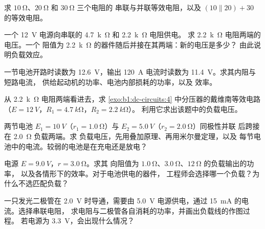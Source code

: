 \begin{exercise}[$\star$]\label{exo:b1:dc-circuits:3}
求 $\qty{10}{\ohm}$、$\qty{20}{\ohm}$ 和 $\qty{30}{\ohm}$ 三个电阻的
串联与并联等效电阻，以及
$(10 \parallel 20) + 30$ 的等效电阻。
\end{exercise}

\begin{exercise}[$\star$]\label{exo:b1:dc-circuits:4}
一个 \qty{12}{V} 电源向串联的 \qty{4.7}{k\ohm} 和 \qty{2.2}{k\ohm} 电阻供电。
求 \qty{2.2}{k\ohm} 电阻两端的电压。一个
阻值为 \qty{2.2}{k\ohm} 的器件随后并接在其两端：新的电压是多少？
由此说明负载效应。
\end{exercise}

\begin{exercise}[$\star\star$]\label{exo:b1:dc-circuits:5}
一节电池开路时读数为 \qty{12.6}{V}，输出
\qty{120}{A} 电流时读数为 \qty{11.4}{V}。求其内阻与短路电流，
供给起动机的功率、电池内部损耗的功率，以及
效率。
\end{exercise}

\begin{exercise}[$\star\star$]\label{exo:b1:dc-circuits:6}
从 \qty{2.2}{k\ohm} 电阻两端看进去，求
\cref{exo:b1:dc-circuits:4} 中分压器的戴维南等效电路
（$E = \qty{12}{V}$，$R_1 = \qty{4.7}{k\ohm}$，$R_2 = \qty{2.2}{k\ohm}$）。
利用它求出该题中的负载电压。
\end{exercise}

\begin{exercise}[$\star\star$]\label{exo:b1:dc-circuits:7}
两节电池 $E_1 = \qty{10}{V}$（$r_1 = \qty{1.0}{\ohm}$）与
$E_2 = \qty{5.0}{V}$（$r_2 = \qty{2.0}{\ohm}$）同极性并联
后跨接在 \qty{2.0}{\ohm} 负载两端。求
负载电压，先用叠加原理、再用米尔曼定理，以及
每节电池中的电流。较弱的电池是在充电还是放电？
\end{exercise}

\begin{exercise}[$\star\star$]\label{exo:b1:dc-circuits:8}
电源 $E = \qty{9.0}{V}$，$r = \qty{3.0}{\ohm}$。求其
向阻值为 $\qty{1.0}{\ohm}$、$\qty{3.0}{\ohm}$、$\qty{12}{\ohm}$ 的负载输出的功率，
以及各情形下的效率。对于电池供电的器件，
工程师会选择哪一个负载？为什么不选匹配负载？
\end{exercise}

\begin{exercise}[$\star\star$]\label{exo:b1:dc-circuits:9}
一只发光二极管在 \qty{2.0}{V} 时导通，需要由
\qty{5.0}{V} 电源供电，通过 \qty{15}{mA} 的电流。选择串联电阻，
求电阻与二极管各自消耗的功率，并画出负载线的作图过程。
若电源为 \qty{3.3}{V}，会出现什么情况？
\end{exercise}


